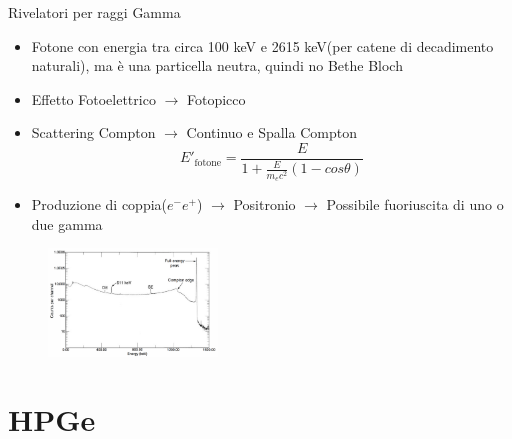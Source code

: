 \documentclass{beamer}
\begin{document}
%
%    

\begin{frame}{Rivelatori per raggi Gamma}
    \begin{itemize}
        \item Fotone con energia tra circa 100 keV e 2615 keV(per catene di decadimento naturali), ma è una particella neutra, quindi no Bethe Bloch
        \item Effetto Fotoelettrico $\to$ Fotopicco
        \item Scattering Compton $\to$ Continuo e Spalla Compton
        \begin{equation}
            E'_{\textrm{fotone}} = \frac{E}{1+\frac{E}{m_e c^2} (1-cos\theta)}
        \end{equation}
        \item Produzione di coppia($e^-e^+$) $\to$ Positronio $\to$ Possibile fuoriuscita di uno o due gamma
    \end{itemize}
    \begin{figure}
        \centering
        \includegraphics[width=0.4\textwidth]{images/spettro_gamma.png}
        \label{fig:my_label}
    \end{figure}
\end{frame}

\section{HPGe}
\end{document}
